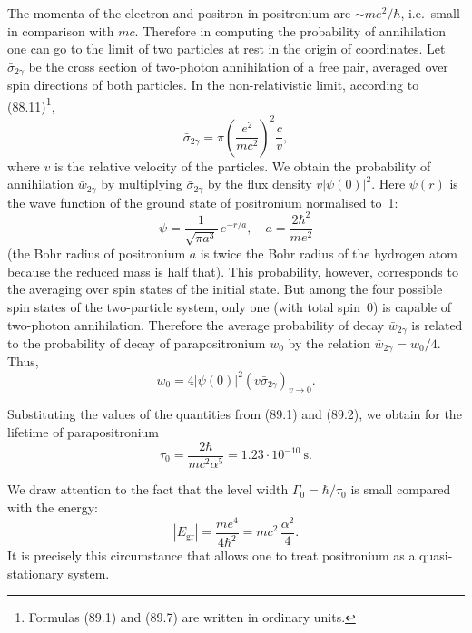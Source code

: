 The momenta of the electron and positron in positronium are $\sim me^2/\hbar$, i.e.\ small in comparison with $mc$. Therefore in computing the probability of annihilation one can go to the limit of two particles at rest in the origin of coordinates. Let $\bar{\sigma}_{2\gamma}$ be the cross section of two-photon annihilation of a free pair, averaged over spin directions of both particles. In the non-relativistic limit, according to (88.11)\footnote{Formulas (89.1) and (89.7) are written in ordinary units.},
\begin{equation}
\bar{\sigma}_{2\gamma} = \pi\left(\frac{e^2}{mc^2}\right)^{\!2}\frac{c}{v},
\label{eq:89.1}
\end{equation}
where $v$ is the relative velocity of the particles. We obtain the probability of annihilation $\bar{w}_{2\gamma}$ by multiplying $\bar{\sigma}_{2\gamma}$ by the flux density $v|\psi(0)|^2$. Here $\psi(r)$ is the wave function of the ground state of positronium normalised to~1:
\begin{equation}
\psi = \frac{1}{\sqrt{\pi a^3}}\,e^{-r/a}, \quad a = \frac{2\hbar^2}{me^2}
\label{eq:89.2}
\end{equation}
(the Bohr radius of positronium $a$ is twice the Bohr radius of the hydrogen atom because the reduced mass is half that). This probability, however, corresponds to the averaging over spin states of the initial state. But among the four possible spin states of the two-particle system, only one (with total spin~0) is capable of two-photon annihilation. Therefore the average probability of decay $\bar{w}_{2\gamma}$ is related to the probability of decay of parapositronium $w_0$ by the relation $\bar{w}_{2\gamma} = w_0/4$. Thus,
\begin{equation}
w_0 = 4|\psi(0)|^2 (v\bar{\sigma}_{2\gamma})_{v\to 0}.
\label{eq:89.3}
\end{equation}

Substituting the values of the quantities from (89.1) and (89.2), we obtain for the lifetime of parapositronium
\begin{equation}
\tau_0 = \frac{2\hbar}{mc^2\alpha^5} = 1.23 \cdot 10^{-10}~\text{s}.
\label{eq:89.4}
\end{equation}

We draw attention to the fact that the level width $\Gamma_0 = \hbar/\tau_0$ is small compared with the energy:
\[
|E_\text{gr}| = \frac{me^4}{4\hbar^2} = mc^2\,\frac{\alpha^2}{4}.
\]
It is precisely this circumstance that allows one to treat positronium as a quasi-stationary system.

